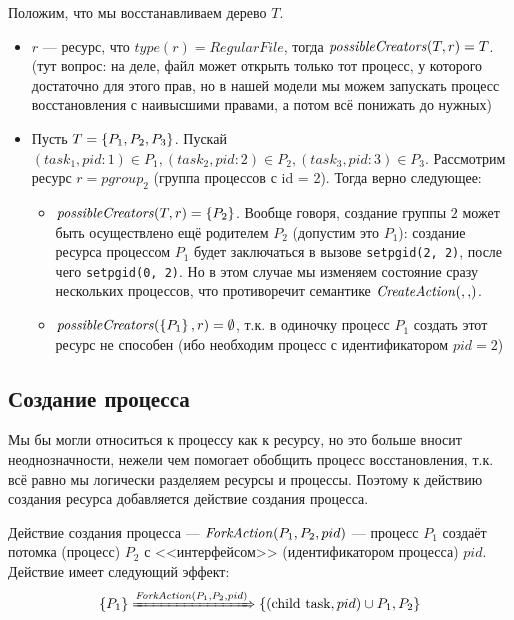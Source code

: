 \begin{exmp}
Положим, что мы восстанавливаем дерево $T$.
\begin{itemize}
	\item $r$ --- ресурс, что $type(r) = RegularFile$, тогда $\text{\textit{possibleCreators}}(T, r) = T$. (тут вопрос: на деле, файл может открыть только тот процесс, у которого достаточно для этого прав, но в нашей модели мы можем запускать процесс восстановления с наивысшими правами, а потом всё понижать до нужных)

	\item Пусть $T = \left\lbrace P_1, P_2, P_3 \right\rbrace$. Пускай $(task_1, pid:1) \in P_1, (task_2, pid:2) \in P_2, (task_3, pid:3) \in P_3$. Рассмотрим ресурс $r = pgroup_2$ (группа процессов с id = 2). Тогда верно следующее:
	\begin{itemize}
		\item $\text{\textit{possibleCreators}}(T, r) = \left\lbrace P_2 \right\rbrace$. Вообще говоря, создание группы $2$ может быть осуществлено ещё родителем $P_2$ (допустим это $P_1$): создание ресурса процессом $P_1$ будет заключаться в вызове \texttt{setpgid(2, 2)}, после чего \texttt{setpgid(0, 2)}. Но в этом случае мы изменяем состояние сразу нескольких процессов, что противоречит семантике $\crcreate{}{}$.
		\item $\text{\textit{possibleCreators}}(\left\lbrace P_1 \right\rbrace, r) = \emptyset$, т.к. в одиночку процесс $P_1$ создать этот ресурс не способен (ибо необходим процесс с идентификатором $pid = 2$)
	\end{itemize}
\end{itemize}
\end{exmp}


\subsection{Создание процесса}

Мы бы могли относиться к процессу как к ресурсу, но это больше вносит неоднозначности, нежели чем помогает обобщить процесс восстановления, т.к. всё равно мы логически разделяем ресурсы и процессы. Поэтому к действию создания ресурса добавляется действие создания процесса.

\begin{defn}
\label{def:forkact}
Действие создания процесса --- $\text{\textit{ForkAction}}(P_1, P_2, pid)$ --- процесс $P_1$ создаёт потомка (процесс) $P_2$ с <<интерфейсом>> (идентификатором процесса) $pid$. Действие имеет следующий эффект:
\begin{equation*}
	\left\lbrace P_1 \right\rbrace \xRightarrow{\text{\textit{ForkAction}}(P_1, P_2, pid)} \left\lbrace (\text{child task}, pid) \cup P_1, P_2 \right\rbrace
\end{equation*}
\end{defn}

